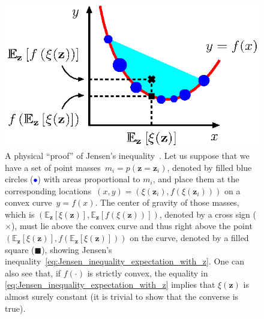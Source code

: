 \documentclass[12pt,a4paper]{article}
\begin{document}
\begin{figure}
\centering
\includegraphics{jensen_inequality.eps}
\caption{A physical ``proof'' of
Jensen's inequality~\citep{MacKay:Information}.
Let us suppose that we have a set of point masses~$m_i = p(\mathbf{z}=\mathbf{z}_i)$,
denoted by filled blue circles ({\large\textcolor{blue}{$\bullet$}})
with areas proportional to $m_i$,
and place them at the corresponding
locations~$(x, y) = \left(\xi(\mathbf{z}_i), f(\xi(\mathbf{z}_i))\right)$
on a convex curve~$y = f(x)$.
The center of gravity of those masses, which is $\left(
\mathbb{E}_{\mathbf{z}}\left[\xi(\mathbf{z})\right],
\mathbb{E}_{\mathbf{z}}\left[f\left(\xi(\mathbf{z})\right)\right]
\right)$, denoted by a cross sign ($\boldsymbol{\times}$),
must lie above the convex curve and thus right above the point~$\left(
\mathbb{E}_{\mathbf{z}}\left[\xi(\mathbf{z})\right],
f\left(\mathbb{E}_{\mathbf{z}}\left[\xi(\mathbf{z})\right]\right)
\right)$ on the curve, denoted by a filled square ($\blacksquare$),
showing Jensen's inequality~\eqref{eq:Jensen_inequality_expectation_with_z}.
One can also see that, if $f(\cdot)$ is strictly convex,
the equality in \eqref{eq:Jensen_inequality_expectation_with_z}
implies that $\xi(\mathbf{z})$ is almost surely constant
(it is trivial to show that the converse is true).}
\label{fig:Jensen_inequality}
\end{figure}
\end{document}
